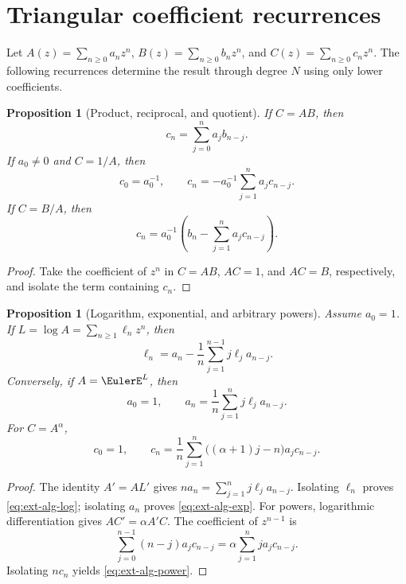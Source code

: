 \documentclass[11pt,a4paper,oneside,openany]{book}
\newtheorem{proposition}[theorem]{Proposition}
\theoremstyle{definition}
\theoremstyle{remark}
\begin{document}
\section{Triangular coefficient recurrences}

Let \(A(z)=\sum_{n\ge0}a_nz^n\),
\(B(z)=\sum_{n\ge0}b_nz^n\), and
\(C(z)=\sum_{n\ge0}c_nz^n\).  The following recurrences determine the result
through degree \(N\) using only lower coefficients.

\begin{proposition}[Product, reciprocal, and quotient]
If \(C=AB\), then
\begin{equation}\label{eq:ext-alg-product}
 c_n=\sum_{j=0}^na_jb_{n-j}.
\end{equation}
If \(a_0\ne0\) and \(C=1/A\), then
\begin{equation}\label{eq:ext-alg-reciprocal}
 c_0=a_0^{-1},\qquad
 c_n=-a_0^{-1}\sum_{j=1}^na_jc_{n-j}.
\end{equation}
If \(C=B/A\), then
\begin{equation}\label{eq:ext-alg-quotient}
 c_n=a_0^{-1}\left(b_n-\sum_{j=1}^na_jc_{n-j}\right).
\end{equation}
\end{proposition}
\begin{proof}
Take the coefficient of \(z^n\) in \(C=AB\), \(AC=1\), and \(AC=B\),
respectively, and isolate the term containing \(c_n\).
\end{proof}

\begin{proposition}[Logarithm, exponential, and arbitrary powers]
Assume \(a_0=1\).  If
\(L=\log A=\sum_{n\ge1}\ell_nz^n\), then
\begin{equation}\label{eq:ext-alg-log}
 \ell_n=a_n-\frac1n\sum_{j=1}^{n-1}j\ell_j a_{n-j}.
\end{equation}
Conversely, if \(A=\EulerE^L\), then
\begin{equation}\label{eq:ext-alg-exp}
 a_0=1,\qquad a_n=\frac1n\sum_{j=1}^n j\ell_j a_{n-j}.
\end{equation}
For \(C=A^\alpha\),
\begin{equation}\label{eq:ext-alg-power}
 c_0=1,
 \qquad
 c_n=\frac1n\sum_{j=1}^n\bigl((\alpha+1)j-n\bigr)a_jc_{n-j}.
\end{equation}
\end{proposition}
\begin{proof}
The identity \(A'=AL'\) gives
\(na_n=\sum_{j=1}^n j\ell_j a_{n-j}\).  Isolating \(\ell_n\) proves
\eqref{eq:ext-alg-log}; isolating \(a_n\) proves
\eqref{eq:ext-alg-exp}.  For powers, logarithmic differentiation gives
\(AC'=\alpha A'C\).  The coefficient of \(z^{n-1}\) is
\[
 \sum_{j=0}^{n-1}(n-j)a_jc_{n-j}
 =\alpha\sum_{j=1}^n j a_jc_{n-j}.
\]
Isolating \(nc_n\) yields \eqref{eq:ext-alg-power}.
\end{proof}
\end{document}
